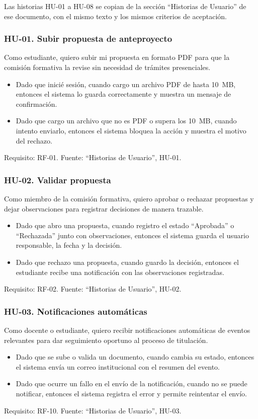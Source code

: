 Las historias HU-01 a HU-08 se copian de la sección \enquote{Historias de Usuario} de ese documento, con el mismo texto y los mismos criterios de aceptación.

\subsubsection*{HU-01. Subir propuesta de anteproyecto}
Como estudiante, quiero subir mi propuesta en formato PDF para que la comisión formativa la revise sin necesidad de trámites presenciales.
\begin{itemize}
  \item Dado que inicié sesión, cuando cargo un archivo PDF de hasta 10~MB, entonces el sistema lo guarda correctamente y muestra un mensaje de confirmación.
  \item Dado que cargo un archivo que no es PDF o supera los 10~MB, cuando intento enviarlo, entonces el sistema bloquea la acción y muestra el motivo del rechazo.
\end{itemize}
Requisito: RF-01. Fuente: \enquote{Historias de Usuario}, HU-01.

\subsubsection*{HU-02. Validar propuesta}
Como miembro de la comisión formativa, quiero aprobar o rechazar propuestas y dejar observaciones para registrar decisiones de manera trazable.
\begin{itemize}
  \item Dado que abro una propuesta, cuando registro el estado \enquote{Aprobada} o \enquote{Rechazada} junto con observaciones, entonces el sistema guarda el usuario responsable, la fecha y la decisión.
  \item Dado que rechazo una propuesta, cuando guardo la decisión, entonces el estudiante recibe una notificación con las observaciones registradas.
\end{itemize}
Requisito: RF-02. Fuente: \enquote{Historias de Usuario}, HU-02.

\subsubsection*{HU-03. Notificaciones automáticas}
Como docente o estudiante, quiero recibir notificaciones automáticas de eventos relevantes para dar seguimiento oportuno al proceso de titulación.
\begin{itemize}
  \item Dado que se sube o valida un documento, cuando cambia su estado, entonces el sistema envía un correo institucional con el resumen del evento.
  \item Dado que ocurre un fallo en el envío de la notificación, cuando no se puede notificar, entonces el sistema registra el error y permite reintentar el envío.
\end{itemize}
Requisito: RF-10. Fuente: \enquote{Historias de Usuario}, HU-03.

